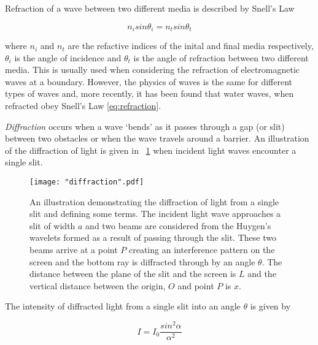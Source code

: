 \documentclass{article}
\newcommand{\figref}[2][\figurename~]{#1\ref{#2}}
\begin{document}
\vspace{2mm}
\noindent
Refraction of a wave between two different media is described by Snell's Law

\begin{equation}
\label{eq:refraction}
n_i sin{\theta_i} = n_t sin{\theta_t}
\end{equation}


\vspace{2mm}
\noindent
where $n_i$ and $n_t$ are the refactive indices of the inital and final media respectively, $\theta_i$ is the angle of incidence and $\theta_t$ is the angle of refraction between two different media. This is usually used when considering the refraction of electromagnetic waves at a boundary. However, the physics of waves is the same for different types of waves and, more recently, it has been found \cite{Web01} that water waves, when refracted obey Snell's Law \eqref{eq:refraction}.

\newpage
\vspace{2mm}
\noindent
\textit{Diffraction} occurs when a wave `bends' as it passes through a gap (or slit) between two obstacles or when the wave travels around a barrier. An illustration of the diffraction of light is given in \figref{fig:diffraction} when incident light waves encounter a single slit.

\begin{figure}[h]
\centering
\texttt{[image: "diffraction".pdf]}
\caption{An illustration demonstrating the diffraction of light from a single slit and defining some terms. The incident light wave approaches a slit of width $a$ and two beams are considered from the Huygen's wavelets \cite{Book01} formed as a result of passing through the slit. These two beams arrive at a point $P$ creating an interference pattern on the screen and the bottom ray is diffracted through by an angle $\theta$. The distance between the plane of the slit and the screen is $L$ and the vertical distance between the origin, $O$ and point $P$ is $x$. }
\label{fig:diffraction}
\end{figure}

\vspace{2mm}
\noindent
The intensity of diffracted light from a single slit into an angle $\theta$ \cite{Paper02} is given by

\begin{equation}
\label{eq:intensity1}
I = I_0 \frac{sin^2{\alpha}}{\alpha^2}
\end{equation}
\end{document}
